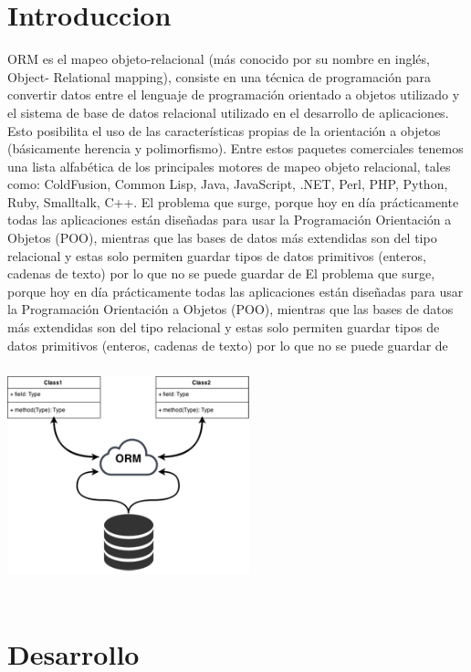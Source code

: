 \documentclass[twoside,twocolumn]{article}
\begin{document}
\section{Introduccion}

ORM es el mapeo objeto-relacional (más conocido por su nombre en inglés, Object- Relational mapping), consiste
en una técnica de programación para convertir datos entre el lenguaje de programación
orientado a objetos utilizado y el sistema de base de datos relacional utilizado en el
desarrollo de aplicaciones. Esto posibilita el uso de las características propias de la
orientación a objetos (básicamente herencia y polimorfismo). Entre estos paquetes comerciales tenemos
una lista alfabética de los principales motores de mapeo objeto relacional, tales como:
ColdFusion, Common Lisp, Java, JavaScript, .NET, Perl, PHP, Python, Ruby, Smalltalk, C++. El problema que surge, porque hoy en
día prácticamente todas las aplicaciones están diseñadas para usar la Programación
Orientación a Objetos (POO), mientras que las bases de datos más extendidas son del
tipo relacional y estas solo permiten guardar tipos de datos primitivos (enteros, cadenas
de texto) por lo que no se puede guardar de El problema que surge, porque hoy en
día prácticamente todas las aplicaciones están diseñadas para usar la Programación
Orientación a Objetos (POO), mientras que las bases de datos más extendidas son del
tipo relacional y estas solo permiten guardar tipos de datos primitivos (enteros, cadenas de texto) por lo que no se puede guardar de 
 \includegraphics[width=7cm, height=7cm]{imagenes/ORM.png}

\section{Desarrollo}
\end{document}
